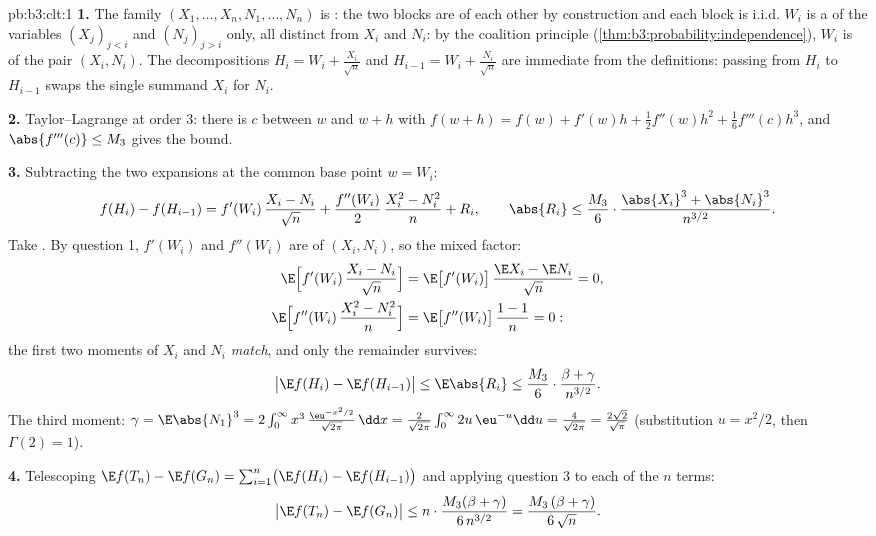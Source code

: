 \begin{solution}{pb:b3:clt:1}
\textbf{1.} The family $(X_1, \dots, X_n, N_1, \dots, N_n)$
is : the two blocks are  of each
other by construction and each block is i.i.d. $W_i$ is a
 of the variables $(X_j)_{j<i}$ and
$(N_j)_{j>i}$ only, all distinct from $X_i$ and $N_i$: by
the coalition principle
(\cref{thm:b3:probability:independence}), $W_i$ is
 of the pair $(X_i, N_i)$. The decompositions
$H_i = W_i + \frac{X_i}{\sqrt n}$ and $H_{i-1} = W_i +
\frac{N_i}{\sqrt n}$ are immediate from the definitions:
passing from $H_i$ to $H_{i-1}$ swaps the single summand
$X_i$ for $N_i$.

\textbf{2.} Taylor--Lagrange at order $3$: there is $c$
between $w$ and $w + h$ with $f(w + h) = f(w) + f'(w)h +
\frac12f''(w)h^2 + \frac16f'''(c)h^3$, and $\abs{f'''(c)}
\leq M_3$ gives the bound.

\textbf{3.} Subtracting the two expansions at the common
base point $w = W_i$:
\[
f(H_i) - f(H_{i-1}) = f'(W_i)\,\frac{X_i - N_i}{\sqrt n} +
\frac{f''(W_i)}{2}\,\frac{X_i^2 - N_i^2}{n} + R_i,
\qquad
\abs{R_i} \leq \frac{M_3}{6}\cdot
\frac{\abs{X_i}^3 + \abs{N_i}^3}{n^{3/2}} .
\]
Take . By question 1, $f'(W_i)$ and $f''(W_i)$
are  of $(X_i, N_i)$, so the mixed 
factor:
\begin{align*}
\E\Bigl[f'(W_i)\,\frac{X_i - N_i}{\sqrt n}\Bigr] &=
\E\bigl[f'(W_i)\bigr]\,\frac{\E X_i - \E N_i}{\sqrt n} = 0,
\\
\E\Bigl[f''(W_i)\,\frac{X_i^2 - N_i^2}{n}\Bigr] &=
\E\bigl[f''(W_i)\bigr]\,\frac{1 - 1}{n} = 0 :
\end{align*}
the first two moments of $X_i$ and $N_i$ \emph{match}, and
only the remainder survives:
\[
\bigl|\E f(H_i) - \E f(H_{i-1})\bigr| \leq \E\abs{R_i} \leq
\frac{M_3}{6}\cdot\frac{\beta + \gamma}{n^{3/2}} .
\]
The  third moment: $\gamma = \E\abs{N_1}^3 =
2\int_0^\infty x^3\,\frac{\eu^{-x^2/2}}{\sqrt{2\pi}}\,\dd x
= \frac{2}{\sqrt{2\pi}}\int_0^\infty 2u\,\eu^{-u}\dd u =
\frac{4}{\sqrt{2\pi}} = \frac{2\sqrt2}{\sqrt\pi}$
(substitution $u = x^2/2$, then $\Gamma(2) = 1$).

\textbf{4.} Telescoping $\E f(T_n) - \E f(G_n) =
\sum_{i=1}^n\bigl(\E f(H_i) - \E f(H_{i-1})\bigr)$ and
applying question 3 to each of the $n$ terms:
\[
\bigl|\E f(T_n) - \E f(G_n)\bigr| \leq
n \cdot \frac{M_3(\beta + \gamma)}{6\,n^{3/2}} =
\frac{M_3\,(\beta + \gamma)}{6\,\sqrt n} .
\]


\end{solution}
